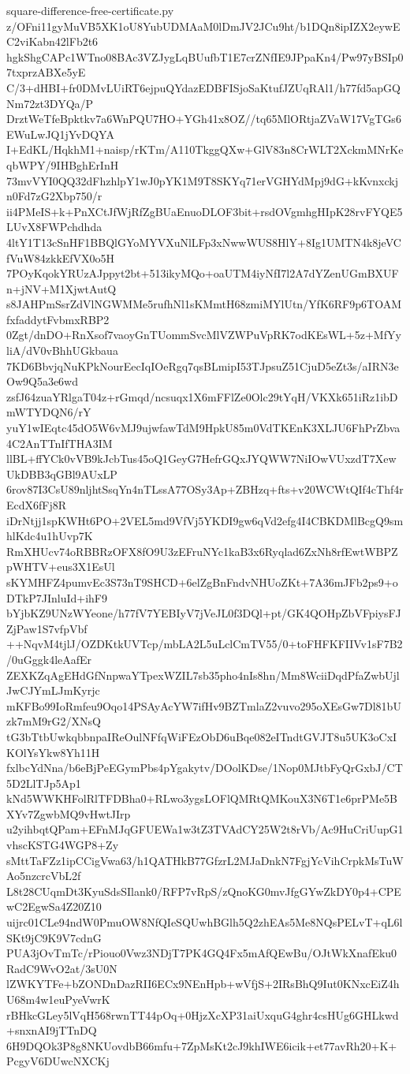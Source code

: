 \documentclass[11pt]{article}
\theoremstyle{definition}
\theoremstyle{remark}
\begin{document}
\begin{filecontents*}[overwrite]{square-difference-free-certificate.py}
z/OFni11gyMuVB5XK1oU8YubUDMAaM0lDmJV2JCu9ht/b1DQn8ipIZX2eywEC2viKabn42lFb2t6
hgkShgCAPc1WTno08BAc3VZJygLqBUufbT1E7crZNfIE9JPpaKn4/Pw97yBSIp07txprzABXe5yE
C/3+dHBI+fr0DMvLUiRT6ejpuQYdazEDBFISjoSaKtufJZUqRAl1/h77fd5apGQNm72zt3DYQa/P
DrztWeTfeBpktkv7a6WnPQU7HO+YGh41x8OZ//tq65MlORtjaZVaW17VgTGs6EWuLwJQ1jYvDQYA
I+EdKL/HqkhM1+naisp/rKTm/A110TkggQXw+GlV83n8CrWLT2XckmMNrKeqbWPY/9IHBghErInH
73mvVYI0QQ32dFhzhlpY1wJ0pYK1M9T8SKYq71erVGHYdMpj9dG+kKvnxckjn0Fd7zG2Xbp750/r
ii4PMeIS+k+PnXCtJfWjRfZgBUaEnuoDLOF3bit+rsdOVgmhgHIpK28rvFYQE5LUvX8FWPchdhda
4ltY1T13cSnHF1BBQlGYoMYVXuNlLFp3xNwwWUS8HlY+8Ig1UMTN4k8jeVCfVuW84zkkEfVX0o5H
7POyKqokYRUzAJppyt2bt+513ikyMQo+oaUTM4iyNfI7l2A7dYZenUGmBXUFn+jNV+M1XjwtAutQ
s8JAHPmSsrZdVlNGWMMe5rufhNl1sKMmtH68zmiMYlUtn/YfK6RF9p6TOAMfxfaddytFvbmxRBP2
0Zgt/dnDO+RnXsof7vaoyGnTUommSvcMlVZWPuVpRK7odKEsWL+5z+MfYyliA/dV0vBhhUGkbaua
7KD6BbvjqNuKPkNourEecIqIOeRgq7qsBLmipI53TJpsuZ51CjuD5eZt3s/aIRN3eOw9Q5a3e6wd
zsfJ64zuaYRlgaT04z+rGmqd/ncsuqx1X6mFFlZe0Olc29tYqH/VKXk651iRz1ibDmWTYDQN6/rY
yuY1wIEqtc45dO5W6vMJ9ujwfawTdM9HpkU85m0VdTKEnK3XLJU6FhPrZbva4C2AnTTnIfTHA3IM
llBL+ffYCk0vVB9kJcbTus45oQ1GeyG7HefrGQxJYQWW7NiIOwVUxzdT7XewUkDBB3qGBl9AUxLP
6rov87I3CsU89nljhtSsqYn4nTLssA77OSy3Ap+ZBHzq+fts+v20WCWtQIf4cThf4rEcdX6fFj8R
iDrNtjj1spKWHt6PO+2VEL5md9VfVj5YKDI9gw6qVd2efg4I4CBKDMlBcgQ9smhlKdc4u1hUvp7K
RmXHUcv74oRBBRzOFX8fO9U3zEFruNYc1kaB3x6Ryqlad6ZxNh8rfEwtWBPZpWHTV+eus3X1EsUl
sKYMHFZ4pumvEc3S73nT9SHCD+6elZgBnFndvNHUoZKt+7A36mJFb2ps9+oDTkP7JInluId+ihF9
bYjbKZ9UNzWYeone/h77fV7YEBIyV7jVeJL0f3DQl+pt/GK4QOHpZbVFpiysFJZjPaw1S7vfpVbf
++NqvM4tjlJ/OZDKtkUVTcp/mbLA2L5uLclCmTV55/0+toFHFKFIIVv1sF7B2/0uGggk4leAafEr
ZEXKZqAgEHdGfNnpwaYTpexWZIL7sb35pho4nIs8hn/Mm8WciiDqdPfaZwbUjlJwCJYmLJmKyrjc
mKFBo99IoRmfeu9Oqo14PSAyAcYW7ifHv9BZTmlaZ2vuvo295oXEsGw7Dl81bUzk7mM9rG2/XNsQ
tG3bTtbUwkqbbnpaIReOulNFfqWiFEzObD6uBqe082eITndtGVJT8u5UK3oCxIKOlYsYkw8Yh11H
fxlbcYdNna/b6eBjPeEGymPbs4pYgakytv/DOolKDse/1Nop0MJtbFyQrGxbJ/CT5D2LlTJp5Ap1
kNd5WWKHFolRlTFDBha0+RLwo3ygsLOFlQMRtQMKouX3N6T1e6prPMe5BXYv7ZgwbMQ9vHwtJIrp
u2yihbqtQPam+EFnMJqGFUEWa1w3tZ3TVAdCY25W2t8rVb/Ac9HuCriUupG1vhscKSTG4WGP8+Zy
sMttTaFZz1ipCCigVwa63/h1QATHkB77GfzrL2MJaDnkN7FgjYcVihCrpkMsTuWAo5nzcrcVbL2f
L8t28CUqmDt3KyuSdsSIlank0/RFP7vRpS/zQnoKG0mvJfgGYwZkDY0p4+CPEwC2EgwSa4Z20Z10
uijrc01CLe94ndW0PmuOW8NfQIeSQUwhBGlh5Q2zhEAs5Me8NQsPELvT+qL6lSKt9jC9K9V7cdnG
PUA3jOvTmTc/rPiouo0Vwz3NDjT7PK4GQ4Fx5mAfQEwBu/OJtWkXnafEku0RadC9WvO2at/3sU0N
lZWKYTFe+bZONDnDazRII6ECx9NEnHpb+wVfjS+2IRsBhQ9Iut0KNxcEiZ4hU68m4w1euPyeVwrK
rBHkcGLey5lVqH568rwnTT44pOq+0HjzXcXP31aiUxquG4ghr4csHUg6GHLkwd+snxnAI9jTTnDQ
6H9DQOk3P8g8NKUovdbB66mfu+7ZpMsKt2cJ9khIWE6icik+et77avRh20+K+PcgyV6DUwcNXCKj

\end{filecontents*}
\end{document}

